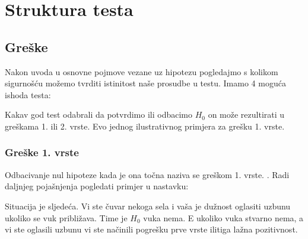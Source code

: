 \chapter{Struktura testa}

\section{Greške}

Nakon uvoda u osnovne pojmove vezane uz hipotezu pogledajmo s kolikom sigurnošću možemo tvrditi istinitost naše prosudbe u testu. Imamo 4 moguća ishoda testa:


\begin{table}[h]
\end{table}

Kakav god test odabrali da potvrdimo ili odbacimo $H_0$ on može rezultirati u greškama 1. ili 2. vrste. Evo jednog ilustrativnog primjera za grešku 1. vrste.

\subsection{Greške 1. vrste}

Odbacivanje nul hipoteze kada je ona točna naziva se greškom 1. vrste. \cite{engstat}. Radi daljnjeg pojašnjenja pogledati primjer u nastavku:

Situacija je sljedeća. Vi ste čuvar nekoga sela i vaša je dužnost oglasiti uzbunu ukoliko se vuk približava. Time je $H_0$ vuka nema. E ukoliko vuka stvarno nema, a vi ste oglasili uzbunu vi ste načinili pogrešku prve vrste ilitiga lažna pozitivnost.

